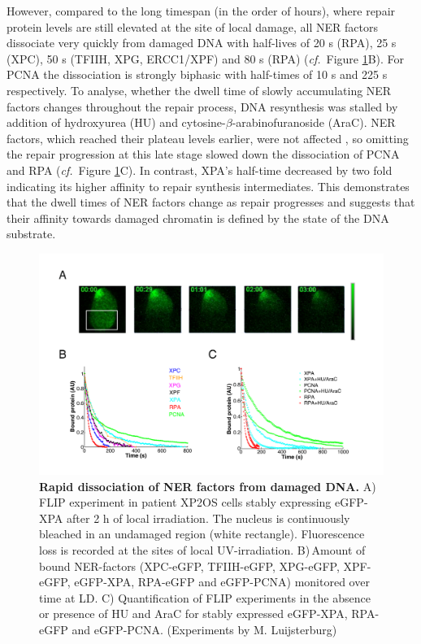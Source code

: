 However, compared to the long timespan (in the order of hours), where repair protein levels are still elevated at the site of local damage, all NER factors dissociate very quickly from damaged DNA with half-lives of 20 s (RPA), 25 s (XPC), 50 s (TFIIH, XPG, ERCC1/XPF) and 80 s (RPA) (\textit{cf.}\ Figure \ref{fig:accuFlip}B). For PCNA the dissociation is strongly biphasic with half-times of 10 s and 225 s respectively. To analyse, whether the dwell time of slowly accumulating NER factors changes throughout the repair process, DNA resynthesis was stalled by addition of hydroxyurea (HU) and cytosine-$\beta$-arabinofuranoside (AraC). NER factors, which reached their plateau levels earlier, were not affected \cite{Luijsterburg2010}, so omitting the repair progression at this late stage slowed down the dissociation of PCNA and RPA (\textit{cf.}\ Figure \ref{fig:accuFlip}C). In contrast, XPA's half-time decreased by two fold indicating its higher affinity to repair synthesis intermediates. This demonstrates that the dwell times of NER factors change as repair progresses and suggests that their affinity towards damaged chromatin is defined by the state of the DNA substrate.      
 \label{sec:FLIP}          
  \begin{figure}[t]
  	\begin{center}
  		\includegraphics[width=1\textwidth]{Abbildungen/figure2_2_2.pdf}
  		\caption{\textbf{Rapid dissociation of NER factors from damaged DNA.} A) FLIP experiment in patient XP2OS cells stably expressing eGFP-XPA after 2 h of local irradiation. The nucleus is continuously bleached in an undamaged region (white rectangle). Fluorescence loss is recorded at the sites of local UV-irradiation. B)\,Amount of bound NER-factors (XPC-eGFP, TFIIH-eGFP, XPG-eGFP, XPF-eGFP, eGFP-XPA, RPA-eGFP and eGFP-PCNA) monitored over time at LD. C) Quantification of FLIP experiments in the absence or presence of HU and AraC for stably expressed eGFP-XPA, RPA-eGFP and eGFP-PCNA. (Experiments by M. Luijsterburg)}
  		\label{fig:accuFlip}
  	\end{center}
  \end{figure}



